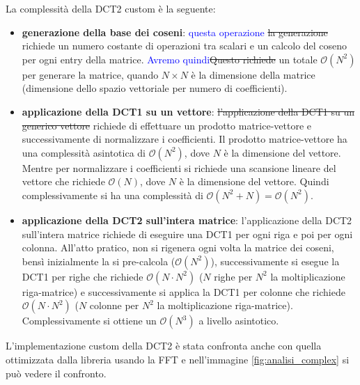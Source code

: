 La complessità della DCT2 custom è la seguente:
\begin{itemize}
    \item \textbf{generazione della base dei coseni}: \textcolor{blue}{questa operazione} \st{la generazione} richiede
          un numero costante di operazioni tra scalari e un calcolo del coseno per ogni
          entry della matrice. \textcolor{blue}{Avremo quindi}\st{Questo richiede} un totale $\mathcal{O}(N^2)$ per generare
          la matrice, quando $N\times N$ è la dimensione della matrice (dimensione dello
          spazio vettoriale per numero di coefficienti).
    \item \textbf{applicazione della DCT1 su un vettore}: \st{l'applicazione della DCT1
              su un generico vettore} richiede di effettuare un prodotto matrice-vettore e
          successivamente di normalizzare i coefficienti. Il prodotto matrice-vettore
          ha una complessità asintotica di $\mathcal{O}(N^2)$, dove $N$ è la dimensione
          del vettore. Mentre per normalizzare i coefficienti si richiede una scansione
          lineare del vettore che richiede $\mathcal{O}(N)$, dove $N$ è la dimensione
          del vettore. Quindi complessivamente si ha una complessità di $\mathcal{O}(N^2 + N) = \mathcal{O}(N^2)$.
    \item \textbf{applicazione della DCT2 sull'intera matrice}: l'applicazione della DCT2
          sull'intera matrice richiede di eseguire una DCT1 per ogni riga e poi per ogni
          colonna. All'atto pratico, non si rigenera ogni volta la matrice dei coseni,
          bensì inizialmente la si pre-calcola ($\mathcal{O}(N^2)$), successivamente si
          esegue la DCT1 per righe che richiede $\mathcal{O}(N \cdot N^2)$ ($N$ righe
          per $N^2$ la moltiplicazione riga-matrice) e successivamente si applica la
          DCT1 per colonne che richiede $\mathcal{O}(N \cdot N^2)$ ($N$ colonne
          per $N^2$ la moltiplicazione riga-matrice). Complessivamente si ottiene
          un $\mathcal{O}(N^3)$ a livello asintotico.
\end{itemize}

L'implementazione custom della DCT2 è stata confronta anche con quella ottimizzata
dalla libreria usando la FFT e nell'immagine \ref{fig:analisi_complex} si
può vedere il confronto.


